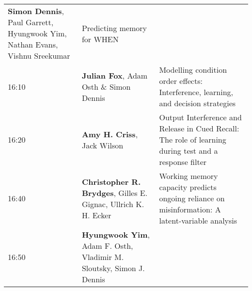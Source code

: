 \documentclass[]{article}
\begin{document}
\begin{longtable}[]{@{}lll@{}}
\begin{minipage}[t]{0.32\columnwidth}
\textbf{Simon Dennis}, Paul Garrett, Hyungwook Yim, Nathan Evans, Vishnu
Sreekumar\strut
\end{minipage} & \begin{minipage}[t]{0.57\columnwidth}\raggedright\strut
Predicting memory for WHEN\strut
\end{minipage}\tabularnewline
\begin{minipage}[t]{0.03\columnwidth}\raggedright\strut
16:10\strut
\end{minipage} & \begin{minipage}[t]{0.32\columnwidth}\raggedright\strut
\textbf{Julian Fox}, Adam Osth \& Simon Dennis\strut
\end{minipage} & \begin{minipage}[t]{0.57\columnwidth}\raggedright\strut
Modelling condition order effects: Interference, learning, and decision
strategies\strut
\end{minipage}\tabularnewline
\begin{minipage}[t]{0.03\columnwidth}\raggedright\strut
16:20\strut
\end{minipage} & \begin{minipage}[t]{0.32\columnwidth}\raggedright\strut
\textbf{Amy H. Criss}, Jack Wilson\strut
\end{minipage} & \begin{minipage}[t]{0.57\columnwidth}\raggedright\strut
Output Interference and Release in Cued Recall: The role of learning
during test and a response filter\strut
\end{minipage}\tabularnewline
\begin{minipage}[t]{0.03\columnwidth}\raggedright\strut
16:40\strut
\end{minipage} & \begin{minipage}[t]{0.32\columnwidth}\raggedright\strut
\textbf{Christopher R. Brydges}, Gilles E. Gignac, Ullrich K. H.
Ecker\strut
\end{minipage} & \begin{minipage}[t]{0.57\columnwidth}\raggedright\strut
Working memory capacity predicts ongoing reliance on misinformation: A
latent-variable analysis\strut
\end{minipage}\tabularnewline
\begin{minipage}[t]{0.03\columnwidth}\raggedright\strut
16:50\strut
\end{minipage} & \begin{minipage}[t]{0.32\columnwidth}\raggedright\strut
\textbf{Hyungwook Yim}, Adam F. Osth, Vladimir M. Sloutsky, Simon J.
Dennis\strut

\end{minipage}
\end{longtable}
\end{document}
